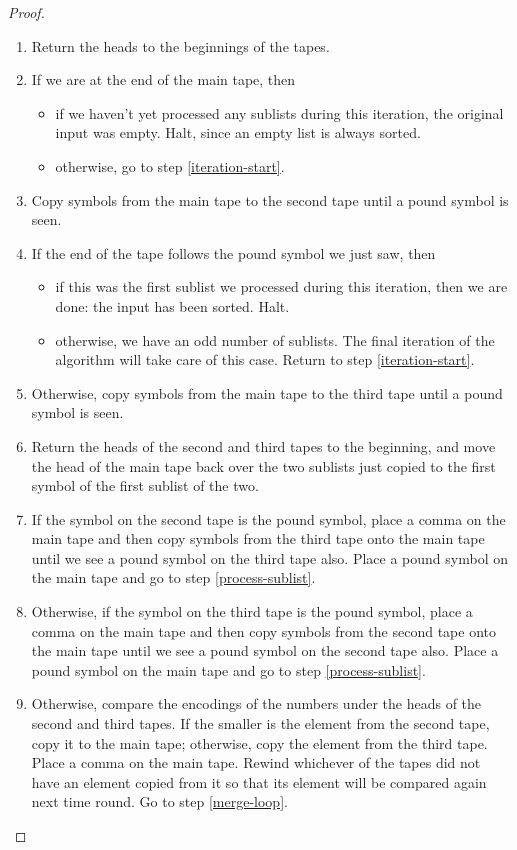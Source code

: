 \documentclass[english]{article}
\theoremstyle{plain}
\theoremstyle{definition}
\theoremstyle{plain}
\begin{document}
\begin{proof}
  \begin{enumerate}
    \item \label{iteration-start} Return the heads to the beginnings
      of the tapes.
    \item \label{process-sublist} If we are at the end of the main
      tape, then
      \begin{itemize}
        \item if we haven't yet processed any sublists during this
          iteration, the original input was empty. Halt, since an
          empty list is always sorted.
        \item otherwise, go to step \ref{iteration-start}.
      \end{itemize}
    \item Copy symbols from the main tape to the second tape until a
      pound symbol is seen.
    \item If the end of the tape follows the pound symbol we just saw,
      then
      \begin{itemize}
        \item if this was the first sublist we processed during this
          iteration, then we are done: the input has been
          sorted. Halt.
        \item otherwise, we have an odd number of sublists. The final
          iteration of the algorithm will take care of this
          case. Return to step \ref{iteration-start}.
      \end{itemize}
    \item Otherwise, copy symbols from the main tape to the third tape
      until a pound symbol is seen.
    \item Return the heads of the second and third tapes to the
      beginning, and move the head of the main tape back over the two
      sublists just copied to the first symbol of the first sublist of
      the two.
    \item \label{merge-loop} If the symbol on the second tape is the
      pound symbol, place a comma on the main tape and then copy
      symbols from the third tape onto the main tape until we see a
      pound symbol on the third tape also. Place a pound symbol on the
      main tape and go to step \ref{process-sublist}.
    \item Otherwise, if the symbol on the third tape is the pound
      symbol, place a comma on the main tape and then copy symbols
      from the second tape onto the main tape until we see a pound
      symbol on the second tape also. Place a pound symbol on the main
      tape and go to step \ref{process-sublist}.
    \item Otherwise, compare the encodings of the numbers under the
      heads of the second and third tapes. If the smaller is the
      element from the second tape, copy it to the main tape;
      otherwise, copy the element from the third tape. Place a comma
      on the main tape. Rewind whichever of the tapes did not have an
      element copied from it so that its element will be compared
      again next time round. Go to step \ref{merge-loop}.
  \end{enumerate}


\end{proof}
\end{document}
